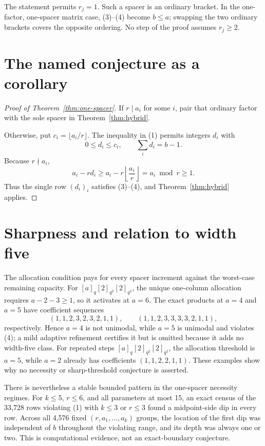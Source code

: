 \documentclass[11pt]{article}
\begin{document}
The statement permits \(r_j=1\).  Such a spacer is an ordinary bracket.  In
the one-factor, one-spacer matrix case, (3)--(4) become \(b\leq a\); swapping
the two ordinary brackets covers the opposite ordering.  No step of the
proof assumes \(r_j\geq2\).

\section{The named conjecture as a corollary}

\begin{proof}[Proof of Theorem~\ref{thm:one-spacer}]
If \(r\mid a_i\) for some \(i\), pair that ordinary factor with the sole
spacer in Theorem~\ref{thm:hybrid}.

Otherwise, put \(c_i=\lfloor a_i/r\rfloor\).  The inequality in (1) permits
integers \(d_i\) with
\[
 0\leq d_i\leq c_i,
 \qquad \sum_i d_i=b-1.
\]
Because \(r\nmid a_i\),
\[
 a_i-rd_i\geq a_i-r\left\lfloor\frac{a_i}{r}\right\rfloor
 =a_i\bmod r\geq1.                                \tag{8}
\]
Thus the single row \((d_i)_i\) satisfies (3)--(4), and
Theorem~\ref{thm:hybrid} applies.
\end{proof}

\section{Sharpness and relation to width five}

The allocation condition pays for every spacer increment against the
worst-case remaining capacity.  For
\([a]_q[2]_{q^2}[2]_{q^3}\), the unique one-column allocation requires
\(a-2-3\geq1\), so it activates at \(a=6\).  The exact products at
\(a=4\) and \(a=5\) have coefficient sequences
\[
 (1,1,2,3,2,3,2,1,1),\qquad
 (1,1,2,3,3,3,3,2,1,1),
\]
respectively.  Hence \(a=4\) is not unimodal, while \(a=5\) is unimodal
and violates (4); a mild adaptive refinement certifies it but is omitted
because it adds no width-five class.  For repeated steps
\([a]_q[2]_{q^2}[2]_{q^2}\), the allocation threshold is \(a=5\), while
\(a=2\) already has coefficients \((1,1,2,2,1,1)\).  These examples show
why no necessity or sharp-threshold conjecture is asserted.

There is nevertheless a stable bounded pattern in the one-spacer necessity
regimes.  For \(k\leq5\), \(r\leq6\), and all parameters at most 15, an
exact census of the 33,728 rows violating (1) with \(k\leq3\) or \(r\leq3\)
found a midpoint-side dip in every row.  Across all 4,576 fixed
\((r,a_1,\ldots,a_k)\) groups, the location of the first dip was independent
of \(b\) throughout the violating range, and its depth was always one or
two.  This is computational evidence, not an exact-boundary conjecture.
\end{document}
